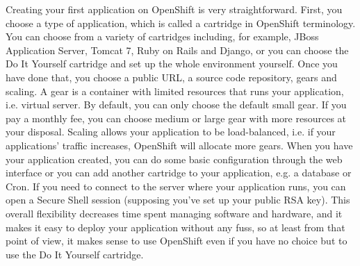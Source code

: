 Creating your first application on OpenShift is very straightforward. First, you choose a type of application, which is called a cartridge in OpenShift terminology. You can choose from a variety of cartridges including, for example, JBoss Application Server, Tomcat 7, Ruby on Rails and Django, or you can choose the Do It Yourself cartridge and set up the whole environment yourself. Once you have done that, you choose a public URL, a source code repository, gears and scaling. A gear is a container with limited resources that runs your application, i.e. virtual server. By default, you can only choose the default small gear. If you pay a monthly fee, you can choose medium or large gear with more resources at your disposal. Scaling allows your application to be load-balanced, i.e. if your applications' traffic increases, OpenShift will allocate more gears. When you have your application created, you can do some basic configuration through the web interface or you can add another cartridge to your application, e.g. a database or Cron. If you need to connect to the server where your application runs, you can open a Secure Shell session (supposing you've set up your public RSA key). This overall flexibility decreases time spent managing software and hardware, and it makes it easy to deploy your application without any fuss, so at least from that point of view, it makes sense to use OpenShift even if you have no choice but to use the Do It Yourself cartridge.

